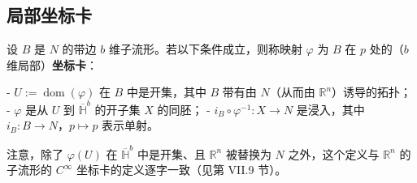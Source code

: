\subsection*{局部坐标卡}

设 $ B $ 是 $ N $ 的带边 $ b $ 维子流形。若以下条件成立，则称映射 $ \varphi $ 为 $ B $ 在 $ p $ 处的（$ b $ 维局部）\textbf{坐标卡}：

- $ U := \operatorname{dom}(\varphi) $ 在 $ B $ 中是开集，其中 $ B $ 带有由 $ N $（从而由 $ \mathbb{R}^n $）诱导的拓扑；
- $ \varphi $ 是从 $ U $ 到 $ \overline{\mathbb{H}}^b $ 的开子集 $ X $ 的同胚；
- $ i_B\circ\varphi^{-1} : X \to N $ 是浸入，其中 $ i_B : B \to N $，$ p \mapsto p $ 表示单射。

注意，除了 $ \varphi(U) $ 在 $ \overline{\mathbb{H}}^b $ 中是开集、且 $ \mathbb{R}^n $ 被替换为 $ N $ 之外，这个定义与 $ \mathbb{R}^n $ 的子流形的 $ C^{\infty} $ 坐标卡的定义逐字一致（见第 VII.9 节）。


